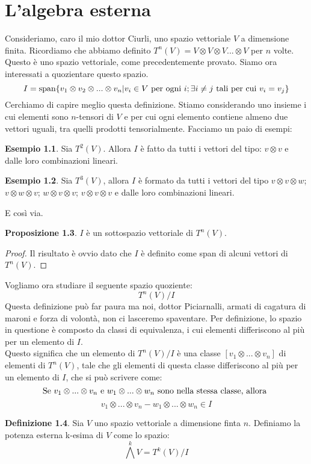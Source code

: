 \documentclass[12pt,a4paper]{report}
\theoremstyle{definition}
\newtheorem{Def}{Definizione}[chapter]
\theoremstyle{Theorem}
\newtheorem{Prop}[Def]{Proposizione}
\theoremstyle{definition}
\newtheorem{Ex}[Def]{Esempio}
\theoremstyle{definition}
\theoremstyle{definition}
\begin{document}
	\chapter{L'algebra esterna}
Consideriamo, caro il mio dottor Ciurli, uno spazio vettoriale $V$ a dimensione finita. Ricordiamo che abbiamo definito $T^n(V)=V\otimes V\otimes V... \otimes V$ per $n$ volte. Questo è uno spazio vettoriale, come precedentemente provato. Siamo ora interessati a quozientare questo spazio. 
$$I=\hbox{span}\{v_1\otimes v_2 \otimes...\otimes v_n|v_i\in V \hbox{ per ogni } i; \exists i\neq j \hbox{ tali per cui } v_i=v_j\}$$
Cerchiamo di capire meglio questa definizione. Stiamo considerando uno insieme i cui elementi sono $n$-tensori di $V$ e per cui ogni elemento contiene almeno due vettori uguali, tra quelli prodotti tensorialmente. Facciamo un paio di esempi:
\begin{Ex}
	Sia $T^2(V)$. Allora $I$ è fatto da tutti i vettori del tipo: $v\otimes v$ e dalle loro combinazioni lineari.
\end{Ex}
\begin{Ex}
	Sia $T^3(V)$, allora $I$ è formato da tutti i vettori del tipo $v\otimes v\otimes w$; $v\otimes w\otimes v$; $w\otimes v\otimes v$; $v\otimes v\otimes v$ e dalle loro combinazioni lineari.
\end{Ex}
E così via.
\begin{Prop}
	$I$ è un sottospazio vettoriale di $T^n(V)$.
\end{Prop}
\begin{proof}
	Il risultato è ovvio dato che $I$ è definito come span di alcuni vettori di $T^n(V)$.
\end{proof}
Vogliamo ora studiare il seguente spazio quoziente: 
$$T^n(V)/I$$
Questa definizione può far paura ma noi, dottor Piciarnalli, armati di cagatura di maroni e forza di volontà, non ci lasceremo spaventare. Per definizione, lo spazio in questione è composto da classi di equivalenza, i cui elementi differiscono al più per un elemento di $I$.\\
Questo significa che un elemento di $T^n(V)/I$ è una classe $[v_1\otimes...\otimes v_n]$ di elementi di $T^n(V)$, tale che gli elementi di questa classe differiscono al più per un elemento di $I$, che si può scrivere come:
$$\hbox{Se } v_1\otimes...\otimes v_n \hbox{ e } w_1\otimes...\otimes w_n \hbox{ sono nella stessa classe, allora }$$
$$ v_1\otimes...\otimes v_n- w_1\otimes...\otimes w_n\in I$$
\begin{Def}
	Sia $V$ uno spazio vettoriale a dimensione finta $n$. Definiamo la potenza esterna k-esima di $V$ come lo spazio:
	$$\bigwedge^k V=T^k(V)/I$$
\end{Def}
\end{document}
